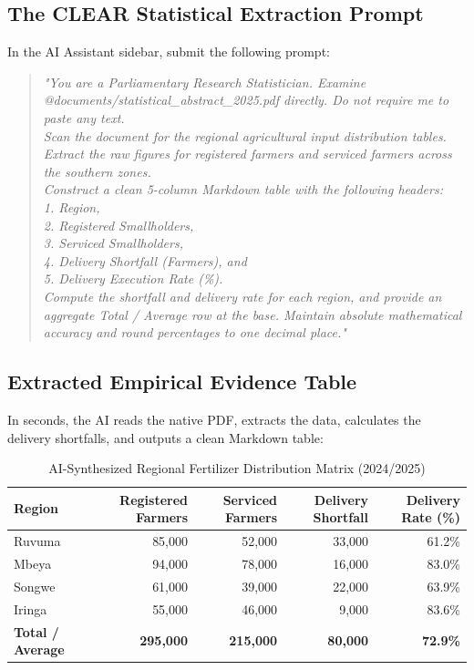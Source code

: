 \documentclass[11pt, a4paper]{report}
\begin{document}
\subsection{The CLEAR Statistical Extraction Prompt}
In the AI Assistant sidebar, submit the following prompt:
\begin{quote}
\small
\textit{"You are a Parliamentary Research Statistician. Examine @documents/statistical\_abstract\_2025.pdf directly. Do not require me to paste any text. \\
Scan the document for the regional agricultural input distribution tables. \\
Extract the raw figures for registered farmers and serviced farmers across the southern zones. \\
Construct a clean 5-column Markdown table with the following headers: \\
1. Region, \\
2. Registered Smallholders, \\
3. Serviced Smallholders, \\
4. Delivery Shortfall (Farmers), and \\
5. Delivery Execution Rate (\%). \\
Compute the shortfall and delivery rate for each region, and provide an aggregate Total / Average row at the base. Maintain absolute mathematical accuracy and round percentages to one decimal place."}
\end{quote}

\subsection{Extracted Empirical Evidence Table}
In seconds, the AI reads the native PDF, extracts the data, calculates the delivery shortfalls, and outputs a clean Markdown table:

\begin{table}[htbp]
\centering
\caption{AI-Synthesized Regional Fertilizer Distribution Matrix (2024/2025)}
\vspace{0.2cm}
\begin{tabular}{lrrrr}
\toprule
\textbf{Region} & \textbf{Registered Farmers} & \textbf{Serviced Farmers} & \textbf{Delivery Shortfall} & \textbf{Delivery Rate (\%)} \\
\midrule
Ruvuma & 85,000 & 52,000 & 33,000 & 61.2\% \\
Mbeya & 94,000 & 78,000 & 16,000 & 83.0\% \\
Songwe & 61,000 & 39,000 & 22,000 & 63.9\% \\
Iringa & 55,000 & 46,000 & 9,000 & 83.6\% \\
\midrule
\textbf{Total / Average} & \textbf{295,000} & \textbf{215,000} & \textbf{80,000} & \textbf{72.9\%} \\
\bottomrule
\end{tabular}
\end{table}
\end{document}
